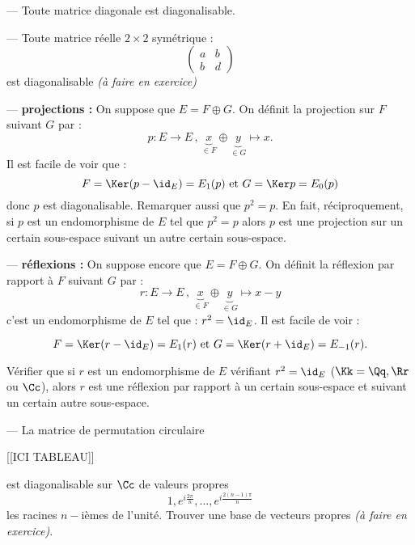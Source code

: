 \documentclass[class=report,crop=false]{standalone}
\newcommand{\exoo}{\emph{(à faire en exercice)}}
\begin{document}
\begin{exemple}

--- Toute matrice diagonale est diagonalisable.

--- Toute matrice réelle $2 \times 2$ symétrique :
\[\left(\begin{array}{cc}
a & b \\
b & d
\end{array}\right)\]
est diagonalisable \exoo

--- {\bf projections :}  On suppose que $E = F \oplus G$. On définit la projection sur $F$ suivant $G$ par :
\[p : E \to E \,,\, \underbrace{x}_{\in F} \oplus \underbrace{y}_{\in G} \mapsto x .\]
Il est facile de voir que :
\[F = \Ker (p -\id_E) = E_1(p) \text{ et } G = \Ker p = E_0(p)\]
donc $p$ est diagonalisable. Remarquer aussi que $p^2=p$. En fait, réciproquement, si $p$ est un endomorphisme de $E$ tel que $p^2=p$ alors $p$ est une projection sur un certain sous-espace suivant un autre certain sous-espace.

--- {\bf réflexions :}  On suppose encore que $E =F \oplus G$. On définit la réflexion par rapport à $F$ suivant $G$ par :
\[r : E \to E \,,\, \underbrace{x}_{\in F} \oplus \underbrace{y}_{\in G} \mapsto x -y\]
c'est un endomorphisme de $E$ tel que : $r^2 =\id_E$. Il est facile de voir :

\[F =\Ker (r-\id_E) =E_1(r) \text{ et } G = \Ker(r+\id_E) =E_{-1}(r) .\]

Vérifier que si $r$ est un endomorphisme de $E$ vérifiant $r^2 =\id_E$ ($\Kk =\Qq,\Rr $ ou $\Cc$), alors $r$ est une réflexion par rapport à un certain sous-espace et suivant un certain autre sous-espace. 

--- La matrice de permutation circulaire 

[[ICI TABLEAU]]



est diagonalisable sur $\Cc$ de valeurs propres \[1,e^{i\frac{2\pi}{n}},...,e^{i\frac{2(n-1)\pi}{n}}\]
les racines $n-$ièmes de l'unité. Trouver une base de vecteurs propres \exoo.
\end{exemple}
\end{document}
